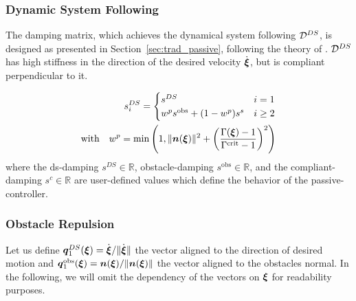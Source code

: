 \documentclass[conference]{IEEEtran}
\begin{document}
\subsubsection{Dynamic System Following}
The damping matrix, which achieves the dynamical system following $\mathcal{D}^{DS}$, is designed as presented in Section~\ref{sec:trad_passive}, following the theory of \cite{kronander2015passive}. $\mathcal{D}^{DS}$ has high stiffness in the direction of the desired velocity $\dot{\boldsymbol{\xi}}$, but is compliant perpendicular to it.

\begin{equation}
  \begin{split}
  s_i^{DS} =
  \begin{cases}
    s^{DS} & i = 1 \\
    w^p s^{\mathrm{obs}} + (1- w^p) s^s & i \geq 2 
  \end{cases} \\
  \text{with} \quad
  w^p = \min \left(1,  \| \boldsymbol{n}(\boldsymbol{\xi}) \|^2 + \left(\frac{\Gamma(\boldsymbol{\xi}) -1}{\Gamma^{\mathrm{crit}} - 1}\right) ^2 \right)
  \end{split}
\end{equation}
where the ds-damping $s^{DS} \in \mathbb{R}$, obstacle-damping $s^{\mathrm{obs}} \in \mathbb{R}$, and the compliant-damping $s^c \in \mathbb{R}$ are user-defined values which define the behavior of the passive-controller.


\subsubsection{Obstacle Repulsion}
Let us define $\boldsymbol{q}^{DS}_1 (\boldsymbol{\xi}) = \dot{\boldsymbol{\xi}} / \lVert \dot{\boldsymbol{\xi}}\rVert$ the vector aligned to the direction of desired motion and $\boldsymbol{q}_1^{\mathrm{obs}}(\boldsymbol{\xi}) =  \boldsymbol{n}(\boldsymbol{\xi}) / \lVert\boldsymbol{n}(\boldsymbol{\xi})\rVert$ the vector aligned to the obstacles normal.
In the following, we will omit the dependency of the vectors on $\boldsymbol{\xi}$ for readability purposes.
\end{document}

